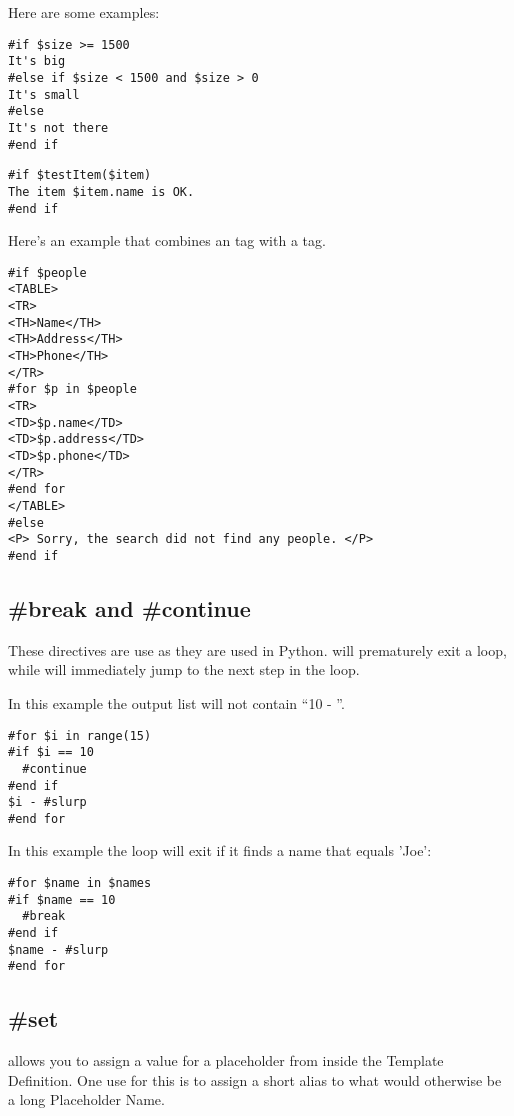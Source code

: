 Here are some examples:
\begin{verbatim}
#if $size >= 1500
It's big
#else if $size < 1500 and $size > 0 
It's small
#else
It's not there
#end if
\end{verbatim}

\begin{verbatim}
#if $testItem($item)
The item $item.name is OK.
#end if
\end{verbatim}

Here's an example that combines an  tag with a  tag.
\begin{verbatim}
#if $people
<TABLE>
<TR>
<TH>Name</TH>
<TH>Address</TH>
<TH>Phone</TH>
</TR>
#for $p in $people
<TR>
<TD>$p.name</TD>
<TD>$p.address</TD>
<TD>$p.phone</TD>
</TR>
#end for
</TABLE>
#else
<P> Sorry, the search did not find any people. </P>
#end if
\end{verbatim}


\subsection{\#break and \#continue}
\label{directives.break}

These directives are use as they are used in Python.  will
prematurely exit a  loop, while  will immediately
jump to the next step in the  loop.

In this example the output list will not contain ``10 - ''. 
\begin{verbatim}
#for $i in range(15)
#if $i == 10
  #continue
#end if
$i - #slurp
#end for
\end{verbatim}

In this example the loop will exit if it finds a name that equals 'Joe':
\begin{verbatim}
#for $name in $names
#if $name == 10
  #break
#end if
$name - #slurp
#end for
\end{verbatim}

\subsection{\#set}
\label{directives.set}

 allows you to assign a value for a placeholder from inside the
Template Definition.  One use for this is to assign a short alias to what would
otherwise be a long Placeholder Name. 

